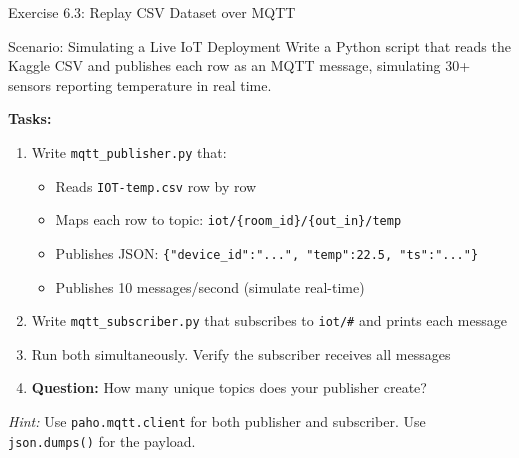 \documentclass[aspectratio=169,11pt]{beamer}
\begin{document}
\begin{frame}{Exercise 6.3: Replay CSV Dataset over MQTT}
    \begin{block}{Scenario: Simulating a Live IoT Deployment}
        Write a Python script that reads the Kaggle CSV and publishes each row as an MQTT message, simulating 30+ sensors reporting temperature in real time.
    \end{block}

    \vspace{0.2cm}
    \textbf{Tasks:}
    \begin{enumerate}
        \item Write \texttt{mqtt\_publisher.py} that:
        \begin{itemize}
            \item Reads \texttt{IOT-temp.csv} row by row
            \item Maps each row to topic: \texttt{iot/\{room\_id\}/\{out\_in\}/temp}
            \item Publishes JSON: \texttt{\{"device\_id":"...", "temp":22.5, "ts":"..."\}}
            \item Publishes 10 messages/second (simulate real-time)
        \end{itemize}
        \item Write \texttt{mqtt\_subscriber.py} that subscribes to \texttt{iot/\#} and prints each message
        \item Run both simultaneously. Verify the subscriber receives all messages
        \item \textbf{Question:} How many unique topics does your publisher create?
    \end{enumerate}

    \vspace{0.1cm}
    {\footnotesize \textit{Hint:} Use \texttt{paho.mqtt.client} for both publisher and subscriber. Use \texttt{json.dumps()} for the payload.}
\end{frame}
\end{document}
